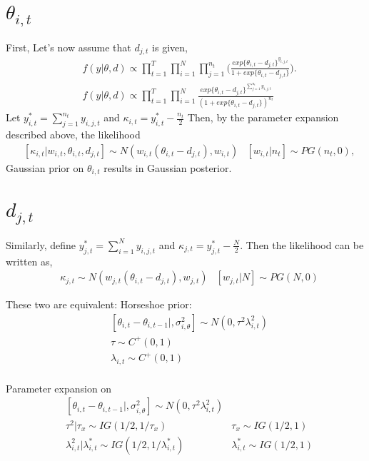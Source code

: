 \documentclass[12pt]{article}
\begin{document}
\section{$\theta_{i,t}$}
First, Let's now assume that $d_{j,t}$ is given,
\begin{align*}
	&f(y|\theta,d)  \propto \prod_{t=1}^{T}\prod_{i=1}^{N}\prod_{j=1}^{n_t} \bigg(\frac{exp\{\theta_{i,t} - d_{j,t}\}^{y_{i,j,t}}}{1+exp\{\theta_{i,t} - d_{j,t}\}}\bigg). \\
	&f(y|\theta,d)  \propto \prod_{t=1}^{T}\prod_{i=1}^{N}\frac{exp\{\theta_{i,t} - d_{j,t}\}^{\sum_{j=1}^{n_t}
	y_{i,j,t}}}{(1+exp\{\theta_{i,t} - d_{j,t}\})^{n_t}} 	
\end{align*}
Let $y^*_{i,t} = \sum_{j=1}^{n_t}y_{i,j,t}$ and $\kappa_{i,t} = y^*_{i,t} - \frac{n_t}{2}$ Then, by the parameter expansion described above, the likelihood
\begin{align*}
	&[\kappa_{i,t}|w_{i,t},\theta_{i,t},d_{j,t}] \sim N(w_{i,t}(\theta_{i,t} - d_{j,t}), w_{i,t}) & [w_{i,t}|n_t] \sim PG(n_t,0),
\end{align*}
Gaussian prior on $\theta_{i,t}$ results in Gaussian posterior. 

\section{$d_{j,t}$}
Similarly, define $y^{*}_{j,t} = \sum_{i=1}^{N} y_{i,j,t}$ and $\kappa_{j,t} = y^*_{j,t} - \frac{N}{2}$. Then the likelihood can be written as,
\begin{align*}
	&\kappa_{j,t}  \sim N(w_{j,t}(\theta_{i,t} - d_{j,t}),w_{j,t}) & [w_{j,t}|N] \sim PG(N,0)
\end{align*}

These two are equivalent:
\newpage
Horseshoe prior:
\begin{align*}
	&[\theta_{i,t} - \theta_{i,t-1}|,\sigma^2_{i,\theta}] \sim N(0,\tau^2\lambda^2_{i,t})\\
	&\tau \sim C^{+}(0,1) \\
	&\lambda_{i,t} \sim C^{+}(0,1)\\
\end{align*}

Parameter expansion on 
\begin{align*}
	&[\theta_{i,t} - \theta_{i,t-1}|,\sigma^2_{i,\theta}] \sim N(0,\tau^2\lambda^2_{i,t})\\
	&\tau^2|\tau_x  \sim IG(1/2,1/\tau_x) & \tau_x \sim IG(1/2,1) \\
	&\lambda_{i,t}^2|\lambda_{i,t}^*  \sim IG(1/2,1/\lambda_{i,t}^*) & \lambda_{i,t}^* \sim IG(1/2,1) \\
\end{align*}
\end{document}
